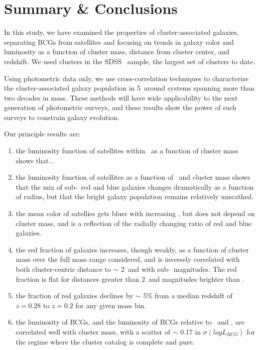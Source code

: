 \documentclass{emulateapj}
\begin{document}




\section{Summary \& Conclusions}\label{sec:conclusion}
In this study, we have examined the properties of cluster-associated galaxies, separating BCGs from satellites and focusing on trends in galaxy color and luminosity as a function of cluster mass, distance from cluster center, and redshift. We used clusters in the SDSS \maxbcg\ sample, the largest set of clusters to date. 

Using photometric data only, we use cross-correlation techniques to characterize the cluster-associated galaxy population in 5\rtwo\ around systems spanning more than two decades in mass.
These methods will have wide applicability to the next generation of
photometric surveys, and these results show the power of such surveys
to constrain galaxy evolution.

Our principle results are:
\begin{enumerate}
\item the luminosity function of satellites within \rtwo\ as a function of cluster mass shows that...

\item the luminosity function of satellites as a function of \rad\ and cluster mass shows that the mix of sub-\Lstar\ red and blue galaxies changes dramatically as a function of radius, but that the bright galaxy population remains relatively unscathed.

\item the mean color of satellies gets bluer with increasing \rad, but does not depend on cluster mass, and is a reflection of the radially changing ratio of red and blue galaxies.

\item the red fraction of galaxies increases, though weakly, as a function of cluster mass over the full mass range considered, and is inversely correlated with both cluster-centric distance to $\sim$ 2\rtwo\ and with sub-\Lstar\ magnitudes. The red fraction is flat for distances greater than 2\rtwo\ and magnitudes brighter than \Lstar.

\item the fraction of red galaxies declines by $\sim$ 5\% from a median redshift of $z=0.28$ to $z=0.2$ for any given mass bin.

\item the luminosity of BCGs, and the luminosity of BCGs relative to \deltalvir\ and \Lstar, are correlated well with cluster mass, with a scatter of $\sim$ 0.17 in $\sigma(logL_{BCG})$ for the regime where the cluster catalog is complete and pure.
\end{enumerate}
\end{document}
